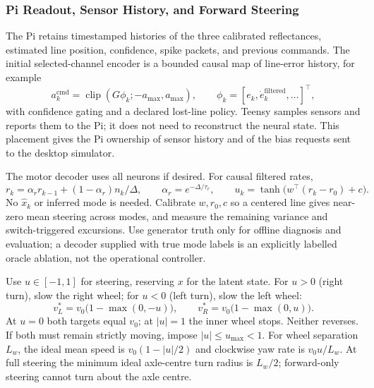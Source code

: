 \subsubsection{Pi Readout, Sensor History, and Forward Steering}
The Pi retains timestamped histories of the three calibrated reflectances, estimated line position, confidence, spike packets, and previous commands. The initial selected-channel encoder is a bounded causal map of line-error history, for example
\begin{equation}
 a_k^{\mathrm{cmd}}=\operatorname{clip}
    \left(G\phi_k;-a_{\max},a_{\max}\right),\qquad
 \phi_k=[e_k,\dot e_k^{\mathrm{filtered}},\ldots]^{\top},
 \label{eq:sensor-encoder}
\end{equation}
with confidence gating and a declared lost-line policy. Teensy samples sensors and reports them to the Pi; it does not need to reconstruct the neural state. This placement gives the Pi ownership of sensor history and of the bias requests sent to the desktop simulator.

The motor decoder uses all neurons if desired. For causal filtered rates,
\begin{equation}
 r_k=\alpha_r r_{k-1}+(1-\alpha_r)n_k/\Delta,\qquad
 \alpha_r=e^{-\Delta/\tau_r},\qquad
 u_k=\tanh\bigl(w^{\top}(r_k-r_0)+c\bigr).
 \label{eq:steering-readout}
\end{equation}
No $\hat x_k$ or inferred mode is needed. Calibrate $w,r_0,c$ so a centered line gives near-zero mean steering across modes, and measure the remaining variance and switch-triggered excursions. Use generator truth only for offline diagnosis and evaluation; a decoder supplied with true mode labels is an explicitly labelled oracle ablation, not the operational controller.

Use $u\in[-1,1]$ for steering, reserving $x$ for the latent state. For $u>0$ (right turn), slow the right wheel; for $u<0$ (left turn), slow the left wheel:
\begin{equation}
 v_L^{*}=v_0\bigl(1-\max(0,-u)\bigr),\qquad
 v_R^{*}=v_0\bigl(1-\max(0,u)\bigr).
 \label{eq:forward-wheel-law}
\end{equation}
At $u=0$ both targets equal $v_0$; at $|u|=1$ the inner wheel stops. Neither reverses. If both must remain strictly moving, impose $|u|\le u_{\max}<1$. For wheel separation $L_w$, the ideal mean speed is $v_0(1-|u|/2)$ and clockwise yaw rate is $v_0u/L_w$. At full steering the minimum ideal axle-centre turn radius is $L_w/2$; forward-only steering cannot turn about the axle centre.

